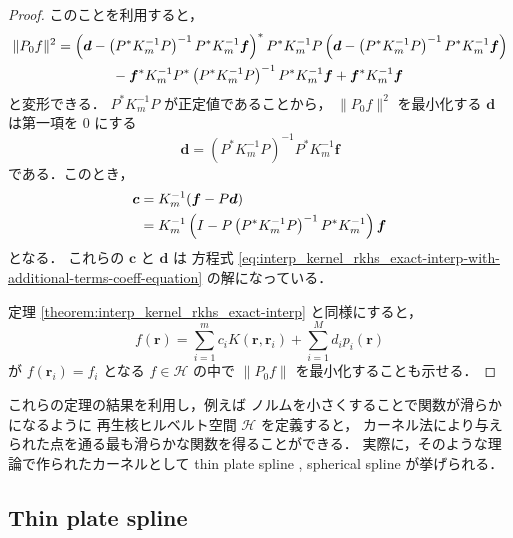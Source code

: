 \begin{proof}
    このことを利用すると，
    \begin{align}
        \|P_0 f\|^2 & =
        \left( \bm{d} - \left( P^* K_m^{-1} P \right)^{-1} P^* K_m^{-1} \bm{f} \right)^* P^* K_m^{-1} P
        \left( \bm{d} - \left( P^* K_m^{-1} P \right)^{-1} P^* K_m^{-1} \bm{f} \right)
        \notag          \\ & \hspace{4em}
        - \bm{f}^* K_m^{-1} P^* \left( P^* K_m^{-1} P \right)^{-1} P^* K_m^{-1} \bm{f}
        + \bm{f}^* K_m^{-1} \bm{f}
    \end{align}
    と変形できる．
    $P^* K_m^{-1} P$ が正定値であることから，
    $\|P_0 f\|^2$ を最小化する $\bm{d}$ は第一項を 0 にする
    \begin{equation}
        \bm{d} = \left( P^* K_m^{-1} P \right)^{-1} P^* K_m^{-1} \bm{f}
    \end{equation}
    である．このとき，
    \begin{align}
        \bm{c}
         & = K_m^{-1} (\bm{f} - P \bm{d})
        \notag                                                                                    \\
         & = K_m^{-1} \left( I - P \left( P^* K_m^{-1} P \right)^{-1} P^* K_m^{-1} \right) \bm{f}
    \end{align}
    となる．
    これらの $\bm{c}$ と $\bm{d}$ は
    方程式 \eqref{eq:interp_kernel_rkhs_exact-interp-with-additional-terms-coeff-equation}
    の解になっている．

    定理 \ref{theorem:interp_kernel_rkhs_exact-interp} と同様にすると，
    \begin{equation}
        f(\bm{r}) = \sum_{i = 1}^{m} c_i K(\bm{r}, \bm{r}_i) + \sum_{i=1}^M d_i p_i(\bm{r})
    \end{equation}
    が $f(\bm{r}_i) = f_i$ となる $f \in \mathcal{H}$ の中で $\|P_0 f\|$ を最小化することも示せる．
\end{proof}

これらの定理の結果を利用し，例えば
ノルムを小さくすることで関数が滑らかになるように
再生核ヒルベルト空間 $\mathcal{H}$ を定義すると，
カーネル法により与えられた点を通る最も滑らかな関数を得ることができる．
実際に，そのような理論で作られたカーネルとして
thin plate spline \cite{Ghosh2010},
spherical spline \cite{Wahba1981}
が挙げられる．

\subsection{Thin plate spline}

